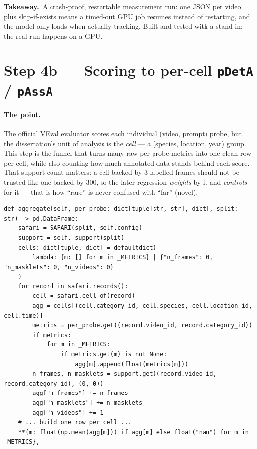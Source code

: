 \documentclass[11pt,a4paper]{article}
\newcommand{\code}[1]{\texttt{#1}}
\newcommand{\srcfile}[1]{\smallskip\noindent{\footnotesize\color{navy}\ttfamily\textbf{#1}}\par\nobreak\vspace{-0.15em}}
\newcommand{\takeaway}[1]{\smallskip\noindent%
  \colorbox{forest!8}{\parbox{\dimexpr\linewidth-2\fboxsep\relax}{%
  \small{\color{forest}\textbf{Takeaway.}}\ #1}}\smallskip}
\begin{document}
\takeaway{A crash-proof, restartable measurement run: one JSON per video plus skip-if-exists means a
timed-out GPU job resumes instead of restarting, and the model only loads when actually tracking. Built and
tested with a stand-in; the real run happens on a GPU.}

\section{Step 4b --- Scoring to per-cell \code{pDetA} / \code{pAssA}}

\paragraph{The point.}
The official VEval evaluator scores each individual (video, prompt) probe, but the dissertation's unit of
analysis is the \emph{cell} --- a (species, location, year) group. This step is the funnel that turns many
raw per-probe metrics into one clean row per cell, while also counting how much annotated data stands behind
each score. That support count matters: a cell backed by 3 labelled frames should not be trusted like one
backed by 300, so the later regression \emph{weights} by it and \emph{controls} for it --- that is how
``rare'' is never confused with ``far'' (novel).

\srcfile{src/eval/score.py}
\begin{lstlisting}[style=py]
def aggregate(self, per_probe: dict[tuple[str, str], dict], split: str) -> pd.DataFrame:
    safari = SAFARI(split, self.config)
    support = self._support(split)
    cells: dict[tuple, dict] = defaultdict(
        lambda: {m: [] for m in _METRICS} | {"n_frames": 0, "n_masklets": 0, "n_videos": 0}
    )
    for record in safari.records():
        cell = safari.cell_of(record)
        agg = cells[(cell.category_id, cell.species, cell.location_id, cell.time)]
        metrics = per_probe.get((record.video_id, record.category_id))
        if metrics:
            for m in _METRICS:
                if metrics.get(m) is not None:
                    agg[m].append(float(metrics[m]))
        n_frames, n_masklets = support.get((record.video_id, record.category_id), (0, 0))
        agg["n_frames"] += n_frames
        agg["n_masklets"] += n_masklets
        agg["n_videos"] += 1
    # ... build one row per cell ...
    **{m: float(np.mean(agg[m])) if agg[m] else float("nan") for m in _METRICS},
\end{lstlisting}
\end{document}
